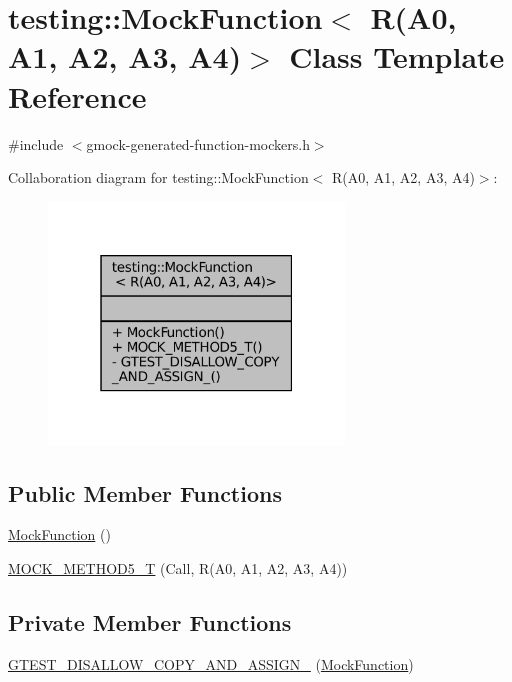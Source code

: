\hypertarget{classtesting_1_1MockFunction_3_01R_07A0_00_01A1_00_01A2_00_01A3_00_01A4_08_4}{}\section{testing\+:\+:Mock\+Function$<$ R(A0, A1, A2, A3, A4)$>$ Class Template Reference}
\label{classtesting_1_1MockFunction_3_01R_07A0_00_01A1_00_01A2_00_01A3_00_01A4_08_4}


{\ttfamily \#include $<$gmock-\/generated-\/function-\/mockers.\+h$>$}



Collaboration diagram for testing\+:\+:Mock\+Function$<$ R(A0, A1, A2, A3, A4)$>$\+:
\nopagebreak
\begin{figure}[H]
\begin{center}
\leavevmode
\includegraphics[width=223pt]{classtesting_1_1MockFunction_3_01R_07A0_00_01A1_00_01A2_00_01A3_00_01A4_08_4__coll__graph}
\end{center}
\end{figure}
\subsection*{Public Member Functions}
\begin{DoxyCompactItemize}
\item 
\hyperlink{classtesting_1_1MockFunction_3_01R_07A0_00_01A1_00_01A2_00_01A3_00_01A4_08_4_a8f54e305eb5e5cf5f7da836937e159ef}{Mock\+Function} ()
\item 
\hyperlink{classtesting_1_1MockFunction_3_01R_07A0_00_01A1_00_01A2_00_01A3_00_01A4_08_4_a572318905fea75f71338c120f7d1833d}{M\+O\+C\+K\+\_\+\+M\+E\+T\+H\+O\+D5\+\_\+T} (Call, R(A0, A1, A2, A3, A4))
\end{DoxyCompactItemize}
\subsection*{Private Member Functions}
\begin{DoxyCompactItemize}
\item 
\hyperlink{classtesting_1_1MockFunction_3_01R_07A0_00_01A1_00_01A2_00_01A3_00_01A4_08_4_aa38af486d20b1017608703b99987a955}{G\+T\+E\+S\+T\+\_\+\+D\+I\+S\+A\+L\+L\+O\+W\+\_\+\+C\+O\+P\+Y\+\_\+\+A\+N\+D\+\_\+\+A\+S\+S\+I\+G\+N\+\_\+} (\hyperlink{classtesting_1_1MockFunction}{Mock\+Function})
\end{DoxyCompactItemize}


